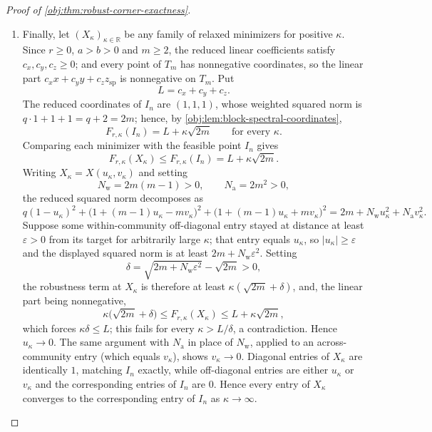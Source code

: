 \documentclass[11pt]{article}
\begin{document}
\begin{proof}[Proof of \cref{obj:thm:robust-corner-exactness}]
\begin{enumerate}
\item Finally, let \((X_\kappa)_{\kappa\in\mathbb R}\) be any family of relaxed
minimizers for positive \(\kappa\).  Since \(r\ge0\), \(a>b>0\) and \(m\ge2\), the reduced linear
coefficients satisfy \(c_x,c_y,c_z\ge0\); and every point of \(T_m\) has nonnegative coordinates, so the linear part \(c_xx+c_yy+c_zz_{\mathrm{sp}}\) is nonnegative on \(T_m\).  Put
\[
L=c_x+c_y+c_z .
\]
The reduced coordinates of \(I_n\) are \((1,1,1)\), whose weighted squared norm is \(q\cdot1+1+1=q+2=2m\); hence, by \cref{obj:lem:block-spectral-coordinates},
\[
F_{r,\kappa}(I_n)=L+\kappa\sqrt{2m}
\qquad\text{for every }\kappa .
\]
Comparing each minimizer with the feasible point \(I_n\) gives
\[
F_{r,\kappa}(X_\kappa)\le F_{r,\kappa}(I_n)=L+\kappa\sqrt{2m}.
\]
Writing \(X_\kappa=X(u_\kappa,v_\kappa)\) and setting
\[
N_{\mathrm{w}}=2m(m-1)>0,
\qquad
N_{\mathrm{a}}=2m^2>0,
\]
the reduced squared norm decomposes as
\[
q(1-u_\kappa)^2+
\bigl(1+(m-1)u_\kappa-mv_\kappa\bigr)^2+
\bigl(1+(m-1)u_\kappa+mv_\kappa\bigr)^2
=
2m+N_{\mathrm{w}}u_\kappa^2+N_{\mathrm{a}}v_\kappa^2 .
\]
Suppose some within-community off-diagonal entry stayed at distance at least \(\varepsilon>0\) from its target for arbitrarily large \(\kappa\); that entry equals \(u_\kappa\), so \(|u_\kappa|\ge\varepsilon\) and the displayed squared norm is at least \(2m+N_{\mathrm{w}}\varepsilon^2\).  Setting
\[
\delta=\sqrt{2m+N_{\mathrm{w}}\varepsilon^2}-\sqrt{2m}>0,
\]
the robustness term at \(X_\kappa\) is therefore at least \(\kappa(\sqrt{2m}+\delta)\), and, the linear part being nonnegative,
\[
\kappa\bigl(\sqrt{2m}+\delta\bigr)\le F_{r,\kappa}(X_\kappa)
\le L+\kappa\sqrt{2m},
\]
which forces \(\kappa\delta\le L\); this fails for every \(\kappa>L/\delta\), a contradiction.  Hence \(u_\kappa\to0\).  The same argument with \(N_{\mathrm{a}}\) in place of \(N_{\mathrm{w}}\), applied to an across-community entry (which equals \(v_\kappa\)), shows \(v_\kappa\to0\).  Diagonal entries of \(X_\kappa\) are identically \(1\), matching \(I_n\) exactly, while off-diagonal entries
are either \(u_\kappa\) or \(v_\kappa\) and the corresponding entries of \(I_n\) are \(0\). Hence every entry of \(X_\kappa\) converges to
the corresponding entry of \(I_n\) as \(\kappa\to\infty\). %
\end{enumerate}
\end{proof}
\end{document}
